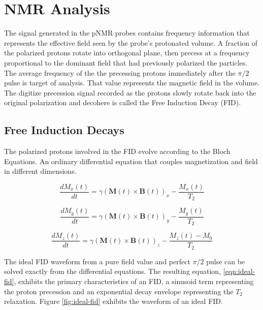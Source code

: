 \section{NMR Analysis}

The signal generated in the pNMR probes contains frequency information that represents the effective field seen by the probe's protonated  volume.  A fraction of the polarized protons rotate into orthogonal plane, then precess at a frequency proportional to the dominant field that had previously polarized the particles.  The average frequency of the the precessing protons immediately after the $\pi/2$ pulse is target of analysis.  That value represents the magnetic field in the volume.  The digitize precession signal recorded as the protons slowly rotate back into the original polarization and decohere is called the Free Induction Decay (FID).


\subsection{Free Induction Decays}

The polarized protons involved in the FID evolve according to the Bloch Equations.  An ordinary differential equation that couples magnetization and field in different dimensions.

\begin{equation}
\label{eqn:bloch-x}
\frac{dM_x(t)}{dt} = 
\gamma (\mathbf{M}(t) \times \mathbf{B}(t))_x - \frac{M_x(t)}{T_2}
\end{equation}

\begin{equation}
\label{eqn:bloch-y}
\frac{dM_y(t)}{dt} = 
\gamma (\mathbf{M}(t)\times \mathbf{B}(t))_y - \frac{M_y(t)}{T_2}
\end{equation}

\begin{equation}
\label{eqn:bloch-z}
\frac{dM_z(t)}{dt} = 
\gamma (\mathbf{M}(t) \times \mathbf{B}(t))_z - \frac{M_z(t) - M_0}{T_2}
\end{equation}

The ideal FID waveform from a pure field value and perfect $\pi/2$ pulse can be solved exactly from the differential equations.  The resulting equation, \ref{eqn:ideal-fid}, exhibits the primary characteristics of an FID, a sinusoid term representing the proton precession and an exponential decay envelope representing the $T_2$ relaxation.  Figure \ref{fig:ideal-fid} exhibits the waveform of an ideal FID.

